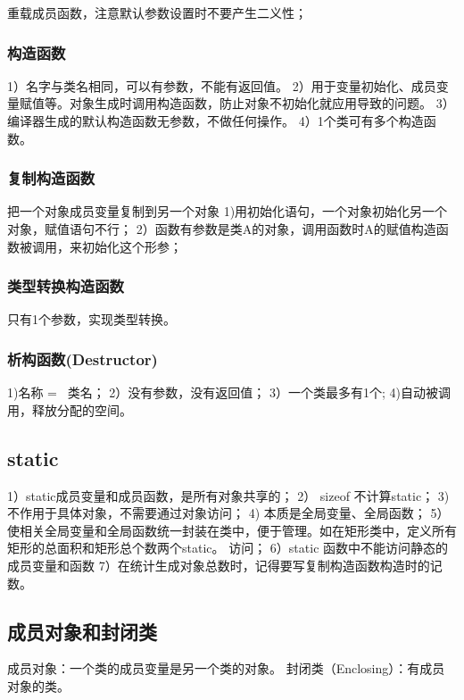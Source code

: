 \documentclass[UTF8]{article}
\begin{document}
重载成员函数，注意默认参数设置时不要产生二义性；


\subsubsection{构造函数}
1）名字与类名相同，可以有参数，不能有返回值。
2）用于变量初始化、成员变量赋值等。对象生成时调用构造函数，防止对象不初始化就应用导致的问题。
3）编译器生成的默认构造函数无参数，不做任何操作。
4）1个类可有多个构造函数。

\subsubsection{复制构造函数}
把一个对象成员变量复制到另一个对象
1)用初始化语句，一个对象初始化另一个对象，赋值语句不行；
2）函数有参数是类A的对象，调用函数时A的赋值构造函数被调用，来初始化这个形参；

\subsubsection{类型转换构造函数}
只有1个参数，实现类型转换。

\subsubsection{析构函数(Destructor)}
1)名称 = ~类名；
2）没有参数，没有返回值；
3）一个类最多有1个;
4)自动被调用，释放分配的空间。


\subsection{static}
1）static成员变量和成员函数，是所有对象共享的；
2） sizeof 不计算static；
3) 不作用于具体对象，不需要通过对象访问；
4) 本质是全局变量、全局函数；
5） 使相关全局变量和全局函数统一封装在类中，便于管理。如在矩形类中，定义所有矩形的总面积和矩形总个数两个static。
访问；
6）static 函数中不能访问静态的成员变量和函数
7）在统计生成对象总数时，记得要写复制构造函数构造时的记数。


\subsection{成员对象和封闭类}
成员对象：一个类的成员变量是另一个类的对象。
封闭类（Enclosing）：有成员对象的类。
\end{document}
